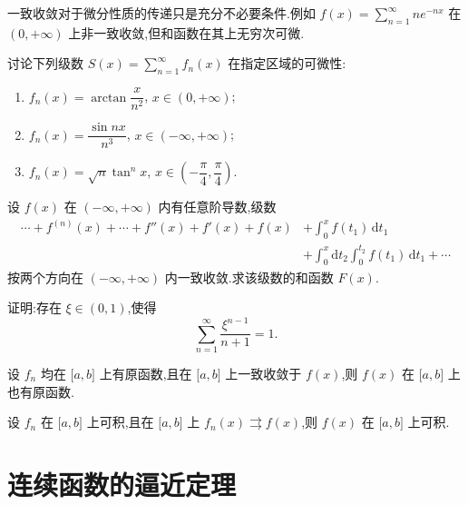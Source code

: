 \documentclass[../数学分析培优讲义.tex]{subfiles}
\begin{document}
一致收敛对于微分性质的传递只是充分不必要条件.例如 $\displaystyle f(x)=\sum\limits_{n=1}^{\infty}ne^{-nx}$ 在 $(0,+\infty)$ 上非一致收敛,但和函数在其上无穷次可微.

\begin{example}
讨论下列级数 $\displaystyle S(x)=\sum\limits_{n=1}^{\infty}f_n(x)$ 在指定区域的可微性:
\begin{enumerate}[label=(\arabic*)]
    \item $f_n(x)=\arctan\dfrac{x}{n^2}$, $x\in(0,+\infty)$;
    \item $f_n(x)=\dfrac{\sin nx}{n^3}$, $x\in(-\infty,+\infty)$;
    \item $f_n(x)=\sqrt n\tan^n x$, $x\in\left(-\dfrac{\pi}{4},\dfrac{\pi}{4}\right)$.
\end{enumerate}
\end{example}
\exampleblank

\begin{example}
设 $f(x)$ 在 $(-\infty,+\infty)$ 内有任意阶导数,级数
\[
\begin{aligned}
    \cdots+f^{(n)}(x)+\cdots+f''(x)+f'(x)+f(x)
    &+\int_0^xf(t_1)\,\mathrm{d}t_1\\
    &+\int_0^x\mathrm{d}t_2\int_0^{t_2}f(t_1)\,\mathrm{d}t_1+\cdots
\end{aligned}
\]
按两个方向在 $(-\infty,+\infty)$ 内一致收敛.求该级数的和函数 $F(x)$.
\end{example}
\exampleblank

\begin{example}
证明:存在 $\xi\in(0,1)$,使得
\[
    \sum\limits_{n=1}^{\infty}\dfrac{\xi^{n-1}}{n+1}=1.
\]
\end{example}
\exampleblank

\begin{example}[\markstar]
设 $f_n$ 均在 $\lbrack a,b\rbrack$ 上有原函数,且在 $\lbrack a,b\rbrack$ 上一致收敛于 $f(x)$,则 $f(x)$ 在 $\lbrack a,b\rbrack$ 上也有原函数.
\end{example}
\exampleblank

\begin{example}[\markstar]
设 $f_n$ 在 $\lbrack a,b\rbrack$ 上可积,且在 $\lbrack a,b\rbrack$ 上 $f_n(x)\rightrightarrows f(x)$,则 $f(x)$ 在 $\lbrack a,b\rbrack$ 上可积.
\end{example}
\exampleblank


\newpage

\section{连续函数的逼近定理}
\end{document}
